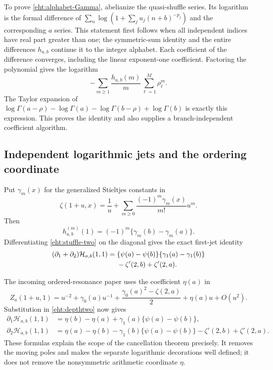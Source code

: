 \documentclass[11pt]{article}
\numberwithin{equation}{section}
\theoremstyle{plain}
\theoremstyle{definition}
\theoremstyle{remark}
\begin{document}
To prove \eqref{eht:alphabet-Gamma}, abelianize the quasi-shuffle series.
Its logarithm is the formal difference of
$\sum_n\log(1+\sum_ju_j(n+b)^{-p_j})$ and the corresponding $a$ series.
This statement first follows when all independent indices have real part
greater than one; the symmetric-sum identity and the entire differences
$h_{a,b}$ continue it to the integer alphabet.  Each coefficient of the
difference converges, including the linear exponent-one coefficient.
Factoring the polynomial gives the logarithm
\[
 -\sum_{m\ge1}\frac{h_{a,b}(m)}m
                     \sum_{\ell=1}^M\rho_\ell^m.
\]
The Taylor expansion of
$\log\Gamma(a-\rho)-\log\Gamma(a)
 -\log\Gamma(b-\rho)+\log\Gamma(b)$ is exactly this expression.
This proves the identity and also supplies a branch-independent
coefficient algorithm.

\subsection{Independent logarithmic jets and the ordering coordinate}

Put $\gamma_m(x)$ for the generalized Stieltjes constants in
\[
 \zeta(1+u,x)=\frac1u+
       \sum_{m\ge0}\frac{(-1)^m\gamma_m(x)}{m!}u^m.
\]
Then
\begin{equation}\label{eht:h-jets}
 h_{a,b}^{(m)}(1)=(-1)^m\{\gamma_m(b)-\gamma_m(a)\}.
\end{equation}
Differentiating \eqref{eht:stuffle-two} on the diagonal gives the exact
first-jet identity
\begin{align}\label{eht:sum-jets}
 (\partial_1+\partial_2)\mathcal H_{a,b}(1,1)
  ={}&\{\psi(a)-\psi(b)\}\{\gamma_1(a)-\gamma_1(b)\}\notag\\
    &-\zeta'(2,b)+\zeta'(2,a).
\end{align}

The incoming ordered-resonance paper uses the coefficient $\eta(a)$ in
\[
 Z_a(1+u,1)=u^{-2}+\gamma_0(a)u^{-1}
       +\frac{\gamma_0(a)^2-\zeta(2,a)}2+\eta(a)u+O(u^2).
\]
Substitution in \eqref{eht:depthtwo} now gives
\begin{align}
 \partial_1\mathcal H_{a,b}(1,1)
   &=\eta(b)-\eta(a)+\gamma_1(a)\{\psi(a)-\psi(b)\},
       \label{eht:first-eta}\\
 \partial_2\mathcal H_{a,b}(1,1)
   &=\eta(a)-\eta(b)-\gamma_1(b)\{\psi(a)-\psi(b)\}
                     -\zeta'(2,b)+\zeta'(2,a).
       \label{eht:second-eta}
\end{align}
These formulas explain the scope of the cancellation theorem precisely.
It removes the moving poles and makes the separate logarithmic
decorations well defined; it does not remove the nonsymmetric arithmetic
coordinate $\eta$.
\end{document}
